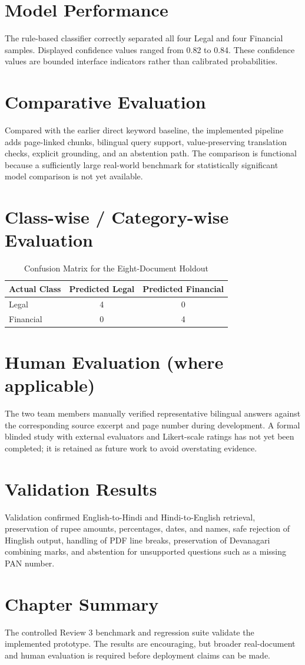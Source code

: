 \section{Model Performance}
The rule-based classifier correctly separated all four Legal and four Financial samples. Displayed confidence values ranged from 0.82 to 0.84. These confidence values are bounded interface indicators rather than calibrated probabilities.

\section{Comparative Evaluation}
Compared with the earlier direct keyword baseline, the implemented pipeline adds page-linked chunks, bilingual query support, value-preserving translation checks, explicit grounding, and an abstention path. The comparison is functional because a sufficiently large real-world benchmark for statistically significant model comparison is not yet available.

\section{Class-wise / Category-wise Evaluation}
\begin{table}[H]
\centering
\caption{Confusion Matrix for the Eight-Document Holdout}
\begin{tabular}{|p{4cm}|c|c|}
\hline
\textbf{Actual Class} & \textbf{Predicted Legal} & \textbf{Predicted Financial} \\
\hline
Legal & 4 & 0 \\
\hline
Financial & 0 & 4 \\
\hline
\end{tabular}
\end{table}

\section{Human Evaluation (where applicable)}
The two team members manually verified representative bilingual answers against the corresponding source excerpt and page number during development. A formal blinded study with external evaluators and Likert-scale ratings has not yet been completed; it is retained as future work to avoid overstating evidence.

\section{Validation Results}
Validation confirmed English-to-Hindi and Hindi-to-English retrieval, preservation of rupee amounts, percentages, dates, and names, safe rejection of Hinglish output, handling of PDF line breaks, preservation of Devanagari combining marks, and abstention for unsupported questions such as a missing PAN number.

\section*{Chapter Summary}
The controlled Review 3 benchmark and regression suite validate the implemented prototype. The results are encouraging, but broader real-document and human evaluation is required before deployment claims can be made.
